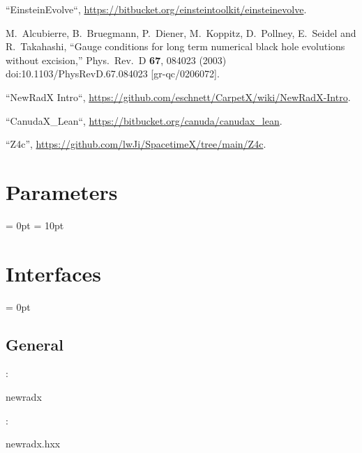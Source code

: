 \begin{thebibliography}{9}

 ``EinsteinEvolve``,
  \url{https://bitbucket.org/einsteintoolkit/einsteinevolve}.

  M.~Alcubierre, B.~Bruegmann, P.~Diener, M.~Koppitz, D.~Pollney, E.~Seidel and R.~Takahashi,
  ``Gauge conditions for long term numerical black hole evolutions without excision,''
  Phys.\ Rev.\ D {\bf 67}, 084023 (2003)
  doi:10.1103/PhysRevD.67.084023
  [gr-qc/0206072].

 ``NewRadX Intro``,
  \url{https://github.com/eschnett/CarpetX/wiki/NewRadX-Intro}.

 ``CanudaX\_Lean``,
  \url{https://bitbucket.org/canuda/canudax_lean}.

 ``Z4c'',
  \url{https://github.com/lwJi/SpacetimeX/tree/main/Z4c}.

\end{thebibliography}




\section{Parameters} 


\parskip = 0pt
\parskip = 10pt 

\section{Interfaces} 


\parskip = 0pt

\vspace{3mm} \subsection*{General}

: 

newradx
\vspace{2mm}

\vspace{5mm}

: 



newradx.hxx
\vspace{2mm}


